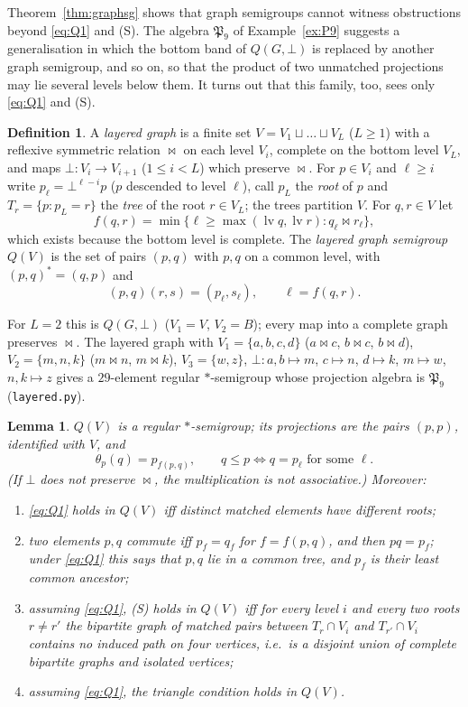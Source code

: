 \documentclass[11pt]{amsart}
\newtheorem{lemma}[theorem]{Lemma}
\theoremstyle{definition}
\newtheorem{definition}[theorem]{Definition}
\begin{document}
Theorem~\ref{thm:graphsg} shows that graph semigroups cannot witness obstructions beyond \eqref{eq:Q1} and (S). The algebra $\mathfrak P_9$ of Example~\ref{ex:P9} suggests a generalisation in which the bottom band of $Q(G,\bot)$ is replaced by another graph semigroup, and so on, so that the product of two unmatched projections may lie several levels below them. It turns out that this family, too, sees only \eqref{eq:Q1} and (S).

\begin{definition}\label{def:layered}
A \emph{layered graph} is a finite set $V=V_1\sqcup\dots\sqcup V_L$ ($L\ge1$) with a reflexive symmetric relation $\bowtie$ on each level $V_i$, complete on the bottom level $V_L$, and maps $\bot\colon V_i\to V_{i+1}$ ($1\le i<L$) which preserve $\bowtie$. For $p\in V_i$ and $\ell\ge i$ write $p_\ell=\bot^{\ell-i}p$ ($p$ descended to level $\ell$), call $p_L$ the \emph{root} of $p$ and $T_r=\{p:p_L=r\}$ the \emph{tree} of the root $r\in V_L$; the trees partition $V$. For $q,r\in V$ let
\[
f(q,r)=\min\{\ell\ge\max(\operatorname{lv}q,\operatorname{lv}r): q_\ell\bowtie r_\ell\},
\]
which exists because the bottom level is complete. The \emph{layered graph semigroup} $Q(V)$ is the set of pairs $(p,q)$ with $p,q$ on a common level, with $(p,q)^*=(q,p)$ and
\[
(p,q)(r,s)=(p_\ell,s_\ell),\qquad \ell=f(q,r).
\]
\end{definition}

For $L=2$ this is $Q(G,\bot)$ ($V_1=V$, $V_2=B$); every map into a complete graph preserves $\bowtie$. The layered graph with $V_1=\{a,b,c,d\}$ ($a\bowtie c$, $b\bowtie c$, $b\bowtie d$), $V_2=\{m,n,k\}$ ($m\bowtie n$, $m\bowtie k$), $V_3=\{w,z\}$, $\bot\colon a,b\mapsto m$, $c\mapsto n$, $d\mapsto k$, $m\mapsto w$, $n,k\mapsto z$ gives a $29$-element regular $*$-semigroup whose projection algebra is $\mathfrak P_9$ (\texttt{layered.py}).

\begin{lemma}\label{lem:layered}
$Q(V)$ is a regular $*$-semigroup; its projections are the pairs $(p,p)$, identified with $V$, and
\[
\theta_p(q)=p_{f(p,q)},\qquad q\le p\iff q=p_\ell\text{ for some }\ell .
\]
(If $\bot$ does not preserve $\bowtie$, the multiplication is not associative.) Moreover:
\begin{enumerate}[label=\textup{(\alph*)},nosep]
\item \eqref{eq:Q1} holds in $Q(V)$ iff distinct matched elements have different roots;
\item two elements $p,q$ commute iff $p_f=q_f$ for $f=f(p,q)$, and then $pq=p_f$; under \eqref{eq:Q1} this says that $p,q$ lie in a common tree, and $p_f$ is their least common ancestor;
\item assuming \eqref{eq:Q1}, (S) holds in $Q(V)$ iff for every level $i$ and every two roots $r\ne r'$ the bipartite graph of matched pairs between $T_r\cap V_i$ and $T_{r'}\cap V_i$ contains no induced path on four vertices, i.e.\ is a disjoint union of complete bipartite graphs and isolated vertices;
\item assuming \eqref{eq:Q1}, the triangle condition holds in $Q(V)$.
\end{enumerate}
\end{lemma}
\end{document}
